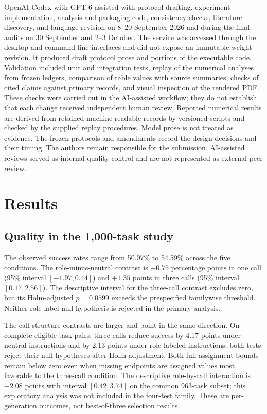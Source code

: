 OpenAI Codex with GPT-6 assisted with protocol drafting, experiment implementation, analysis and packaging code, consistency checks, literature discovery, and language revision on 8--20 September 2026 and during the final audits on 30 September and 2--3 October. The service was accessed through the desktop and command-line interfaces and did not expose an immutable weight revision. It produced draft protocol prose and portions of the executable code. Validation included unit and integration tests, replay of the numerical analyses from frozen ledgers, comparison of table values with source summaries, checks of cited claims against primary records, and visual inspection of the rendered PDF. These checks were carried out in the AI-assisted workflow; they do not establish that each change received independent human review. Reported numerical results are derived from retained machine-readable records by versioned scripts and checked by the supplied replay procedures. Model prose is not treated as evidence. The frozen protocols and amendments record the design decisions and their timing. The authors remain responsible for the submission. AI-assisted reviews served as internal quality control and are not represented as external peer review.

\section{Results}
\subsection{Quality in the 1,000-task study}
The observed success rates range from 50.07\% to 54.59\% across the five conditions. The role-minus-neutral contrast is $-0.75$ percentage points in one call (95\% interval $[-1.97,0.44]$) and $+1.35$ points in three calls (95\% interval $[0.17,2.56]$). The descriptive interval for the three-call contrast excludes zero, but its Holm-adjusted $p=0.0599$ exceeds the prespecified familywise threshold. Neither role-label null hypothesis is rejected in the primary analysis.

The call-structure contrasts are larger and point in the same direction. On complete eligible task pairs, three calls reduce success by 4.17 points under neutral instructions and by 2.13 points under role-labeled instructions; both tests reject their null hypotheses after Holm adjustment. Both full-assignment bounds remain below zero even when missing endpoints are assigned values most favorable to the three-call condition. The descriptive role-by-call interaction is $+2.08$ points with interval $[0.42,3.74]$ on the common 963-task subset; this exploratory analysis was not included in the four-test family. These are per-generation outcomes, not best-of-three selection results.

